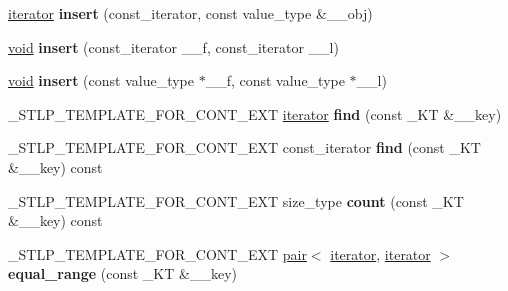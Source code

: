 \begin{DoxyCompactItemize}
\mbox{\label{classunordered__set_afa6bfc60e69f7351da1552fb689ff08d}} 
\hyperlink{structiterator}{iterator} {\bfseries insert} (const\+\_\+iterator, const value\+\_\+type \&\+\_\+\+\_\+obj)
\item 
\mbox{\label{classunordered__set_a1425f2cf004b38387aaa74ccd5915205}} 
\hyperlink{interfacevoid}{void} {\bfseries insert} (const\+\_\+iterator \+\_\+\+\_\+f, const\+\_\+iterator \+\_\+\+\_\+l)
\item 
\mbox{\label{classunordered__set_a2b0251e238bba9e2f1c254502fde8efc}} 
\hyperlink{interfacevoid}{void} {\bfseries insert} (const value\+\_\+type $\ast$\+\_\+\+\_\+f, const value\+\_\+type $\ast$\+\_\+\+\_\+l)
\item 
\mbox{\label{classunordered__set_a057d5ba1ad48e7daf1f14b9c05f19687}} 
\+\_\+\+S\+T\+L\+P\+\_\+\+T\+E\+M\+P\+L\+A\+T\+E\+\_\+\+F\+O\+R\+\_\+\+C\+O\+N\+T\+\_\+\+E\+XT \hyperlink{structiterator}{iterator} {\bfseries find} (const \+\_\+\+KT \&\+\_\+\+\_\+key)
\item 
\mbox{\label{classunordered__set_a83c8f545ac17e4681646b96a6efbca67}} 
\+\_\+\+S\+T\+L\+P\+\_\+\+T\+E\+M\+P\+L\+A\+T\+E\+\_\+\+F\+O\+R\+\_\+\+C\+O\+N\+T\+\_\+\+E\+XT const\+\_\+iterator {\bfseries find} (const \+\_\+\+KT \&\+\_\+\+\_\+key) const
\item 
\mbox{\label{classunordered__set_a581d860ba74a7a18947e1032dd234a0a}} 
\+\_\+\+S\+T\+L\+P\+\_\+\+T\+E\+M\+P\+L\+A\+T\+E\+\_\+\+F\+O\+R\+\_\+\+C\+O\+N\+T\+\_\+\+E\+XT size\+\_\+type {\bfseries count} (const \+\_\+\+KT \&\+\_\+\+\_\+key) const
\item 
\mbox{\label{classunordered__set_a3e8514083324c969b0500ef61e4a3d95}} 
\+\_\+\+S\+T\+L\+P\+\_\+\+T\+E\+M\+P\+L\+A\+T\+E\+\_\+\+F\+O\+R\+\_\+\+C\+O\+N\+T\+\_\+\+E\+XT \hyperlink{structpair}{pair}$<$ \hyperlink{structiterator}{iterator}, \hyperlink{structiterator}{iterator} $>$ {\bfseries equal\+\_\+range} (const \+\_\+\+KT \&\+\_\+\+\_\+key)
\item 
\mbox{\label{classunordered__set_a00b8f7c662ace9e986d7ed2cd35635b5}} 

\end{DoxyCompactItemize}
